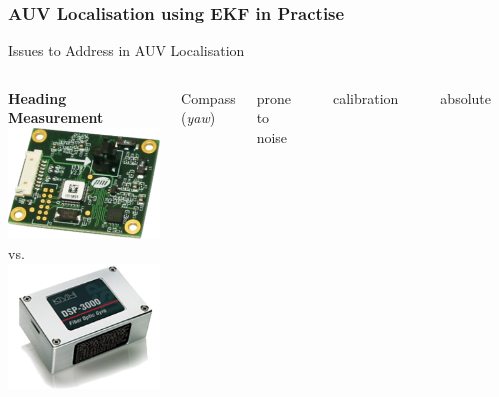\begin{frame}\frametitle{AUV Localisation using EKF in Practise}
\vspace{-5pt}
\begin{block}{}
\end{block} 
\centering
Issues to Address in AUV Localisation%
\begin{columns}[t]
{\centering \textbf{Heading Measurement}} \\
{\centering \hspace{6pt} \includegraphics[width=0.25\linewidth]{fig/tcm.pdf} \hspace{15pt} vs.
\includegraphics[width=0.25\linewidth]{fig/kvh.pdf}} \\
	\begin{columns}[t]
	{\centering	
	Compass {\footnotesize(\textit{yaw})} } \\
	\contra \begin{footnotesize}prone to noise\end{footnotesize} \\
	\contra \begin{footnotesize}calibration\end{footnotesize} \\
	\pro    \begin{footnotesize}absolute\end{footnotesize}  \\ %
		

\end{columns}
\end{columns}
\end{frame}
